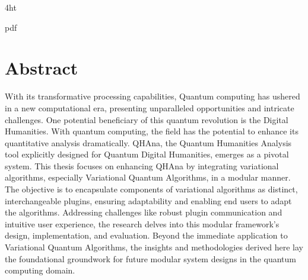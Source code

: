 \documentclass[
  a4paper,  %
  twoside,  %
  bibliography=totoc,
  headsepline,
  cleardoublepage=empty,
  parskip=half,
  draft=false
]{scrbook}
\begin{document}
\iftex4ht
  \Configure{$}{\PicMath}{\EndPicMath}{}

  {pdf}
  {%
  }
\fi



\Titelblatt

\pagestyle{preamble}
\renewcommand*{\chapterpagestyle}{preamble}



\section*{Abstract}
With its transformative processing capabilities, Quantum computing has ushered in a new computational era, presenting unparalleled opportunities and intricate challenges.
One potential beneficiary of this quantum revolution is the Digital Humanities. With quantum computing, the field has the potential to enhance its quantitative analysis dramatically.
QHAna, the Quantum Humanities Analysis tool explicitly designed for Quantum Digital Humanities, emerges as a pivotal system.
This thesis focuses on enhancing QHAna by integrating variational algorithms, especially Variational Quantum Algorithms, in a modular manner.
The objective is to encapsulate components of variational algorithms as distinct, interchangeable plugins, ensuring adaptability and enabling end users to adapt the algorithms.
Addressing challenges like robust plugin communication and intuitive user experience, the research delves into this modular framework's design, implementation, and evaluation.
Beyond the immediate application to Variational Quantum Algorithms, the insights and methodologies derived here lay the foundational groundwork for future modular system designs in the quantum computing domain.
\end{document}

